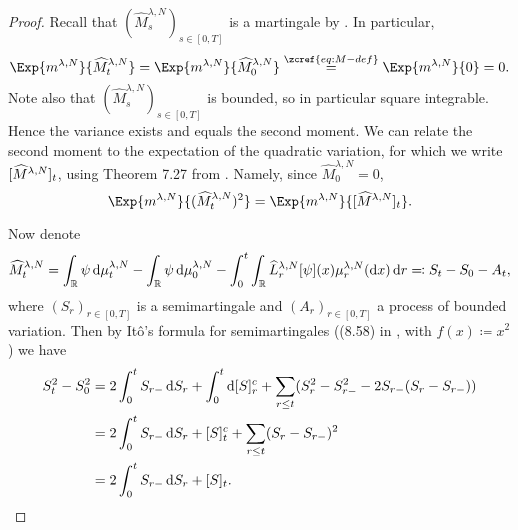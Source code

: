 \begin{proof}
  Recall that $(\widehat{M}_s^{\lambda,N})_{s\in[0,T]}$ is a martingale by .
  In particular,
  \begin{equation}
    \Exp{\lawmu^{\lambda,N}}{\widehat{M}_t^{\lambda,N}} = \Exp{\lawmu^{\lambda,N}}{\widehat{M}_0^{\lambda,N}}
    \overset{\zcref{eq:M-def}}{=} \Exp{\lawmu^{\lambda,N}}{0} = 0.
  \end{equation}
  Note also that $(\widehat{M}_s^{\lambda,N})_{s\in[0,T]}$ is bounded, so in particular square integrable.
  Hence the variance exists and equals the second moment.
  We can relate the second moment to the expectation of the quadratic variation, for which we write $[\widehat{M}^{\lambda,N}]_t$, using Theorem 7.27 from \cite[201]{klebanerIntroductionStochasticCalculus2012}.
  Namely, since $\widehat{M}_0^{\lambda,N} = 0$,
  \begin{equation}
    \Exp{\lawmu^{\lambda,N}}{(\widehat{M}_t^{\lambda,N})^2} = \Exp{\lawmu^{\lambda,N}}{\sbr{\widehat{M}^{\lambda,N}}_t}.
  \end{equation}

  Now denote
  \begin{equation}\label{eq:M=S-A}
    \widehat{M}_t^{\lambda,N} = \int_\potspace \psi \odif{\mu_t^{\lambda, N}} - \int_\potspace \psi \odif{\mu_0^{\lambda, N}} - \int_0^t \int_\potspace \widehat{L}_r^{\lambda, N} [\psi](x) \mu_{r}^{\lambda, N}(\odif{x}) \odif{r}
    \eqqcolon S_t - S_0 - A_t,
  \end{equation}
  where $(S_r)_{r\in[0,T]}$ is a semimartingale and $(A_r)_{r\in[0,T]}$ a process of bounded variation.
  Then by Itô's formula for semimartingales ((8.58) in \cite[236]{klebanerIntroductionStochasticCalculus2012}, with $f(x) \coloneqq x^2$) we have
  \begin{equation}\label{eq:S^2-q-var-rel}
    \begin{split}
      S_t^2 - S_0^2
       & = 2 \int_0^t S_{r-} \odif{S_r} + \int_0^t \odif{\sbr{S}_r^c}
      + \sum_{r \leq t} \br{ S_r^2 - S_{r-}^2  - 2 S_{r-} (S_r - S_{r-}) } \\
       & = 2 \int_0^t S_{r-} \odif{S_r} + \sbr{S}_t^c
      + \sum_{r \leq t} \br{ S_r - S_{r-} }^2                              \\
       & = 2 \int_0^t S_{r-} \odif{S_r} + \sbr{S}_t.
    \end{split}
  \end{equation}


\end{proof}
